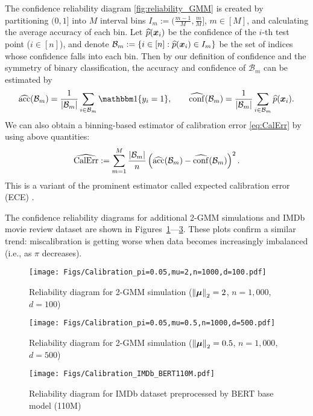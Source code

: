 The confidence reliability diagram \cref{fig:reliability_GMM} is created by partitioning $(0, 1]$ into $M$ interval bins $I_m := (\frac{m-1}{M}, \frac{m}{M}]$, $m \in [M]$, and calculating the average accuracy of each bin. Let $\widehat p(\text{\boldmath $x$}_i)$ be the confidence of the $i$-th test point ($i \in [n]$), and denote $\mathcal{B}_m := \{ i \in [n]: \widehat p(\text{\boldmath $x$}_i) \in I_m \}$ be the set of indices whose confidence falls into each bin. Then by our definition of confidence and the symmetry of binary classification, the accuracy and confidence of $\mathcal{B}_m$ can be estimated by
\begin{equation*}
    \hat{\mathrm{acc}}(\mathcal{B}_m) = \frac{1}{\abs{\mathcal{B}_m}} \sum_{i \in \mathcal{B}_m} \ind\{ y_i = 1 \},
    \qquad
    \hat{\mathrm{conf}}(\mathcal{B}_m) = \frac{1}{\abs{\mathcal{B}_m}} \sum_{i \in \mathcal{B}_m} \hat p(\xx_i).
\end{equation*}
We can also obtain a binning-based estimator of calibration error \cref{eq:CalErr} by using above quantities:
\begin{equation*}
    \widehat{\mathrm{CalErr}} := \sum_{m=1}^M \frac{\left|{\mathcal{B}_m}\right|}{n} \left( \widehat{\mathrm{acc}}(\mathcal{B}_m) - \widehat{\mathrm{conf}}(\mathcal{B}_m) \right)^2.
\end{equation*}
This is a variant of the prominent estimator called expected calibration error (ECE) \cite{guo2017calibration}.

The confidence reliability diagrams for additional 2-GMM simulations and IMDb movie review dataset are shown in Figures~\ref{fig:reliab_diag_mu=2}---\ref{fig:reliab_imdb}. These plots confirm a similar trend: miscalibration is getting worse when data becomes increasingly imbalanced (i.e., as $\pi$ decreases). 


\begin{figure}[t]
    \centering
    \texttt{[image: Figs/Calibration\_pi=0.05,mu=2,n=1000,d=100.pdf]}
    \caption{
    Reliability diagram for 2-GMM simulation ($\left\|{\text{\boldmath $\mu$}}\right\|_2=2$, $n=1,\! 000$, $d=100$)
    }\label{fig:reliab_diag_mu=2}
\end{figure}
\begin{figure}[t]
    \centering
    \texttt{[image: Figs/Calibration\_pi=0.05,mu=0.5,n=1000,d=500.pdf]}
    \caption{
    Reliability diagram for 2-GMM simulation ($\left\|{\text{\boldmath $\mu$}}\right\|_2=0.5$, $n=1,\! 000$, $d=500$)
    }\label{fig:reliab_diag_mu=0.5}
\end{figure}
\begin{figure}[t]
    \centering
\texttt{[image: Figs/Calibration\_IMDb\_BERT110M.pdf]}
    \caption{
    Reliability diagram for IMDb dataset preprocessed by BERT base model (110M)
    }\label{fig:reliab_imdb}
\end{figure}

